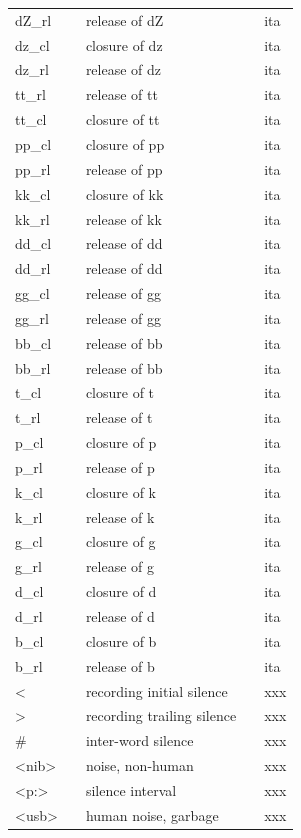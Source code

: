 \documentclass[twoside,a4paper]{book}
\begin{document}
\begin{longtable}{lllll}
	dZ\_rl & & release of dZ & & ita\\
	dz\_cl & & closure of dz & & ita\\
	dz\_rl & & release of dz & & ita\\
	tt\_rl & & release of tt & & ita\\
	tt\_cl & & closure of tt & & ita\\
	pp\_cl & & closure of pp & & ita\\
	pp\_rl & & release of pp & & ita\\
	kk\_cl & & closure of kk & & ita\\
	kk\_rl & & release of kk & & ita\\
	dd\_cl & & release of dd & & ita\\
	dd\_rl & & release of dd & & ita\\
	gg\_cl & & release of gg & & ita\\
	gg\_rl & & release of gg & & ita\\
	bb\_cl & & release of bb & & ita\\
	bb\_rl & & release of bb & & ita\\
	t\_cl & & closure of t & & ita\\
	t\_rl & & release of t & & ita\\
	p\_cl & & closure of p & & ita\\
	p\_rl & & release of p & & ita\\
	k\_cl & & closure of k & & ita\\
	k\_rl & & release of k & & ita\\
	g\_cl & & closure of g & & ita\\
	g\_rl & & release of g & & ita\\
	d\_cl & & closure of d & & ita\\
	d\_rl & & release of d & & ita\\
	b\_cl & & closure of b & & ita\\
	b\_rl & & release of b & & ita\\
	\textless & & recording initial silence & & xxx\\
	\textgreater & & recording trailing silence & & xxx\\
	\# & & inter-word silence & & xxx\\
	\textless nib\textgreater & & noise, non-human & & xxx\\
	\textless p:\textgreater & & silence interval & & xxx\\
	\textless usb\textgreater & & human noise, garbage & & xxx\\
\end{longtable}
\end{document}
